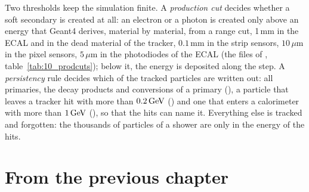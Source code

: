 \begin{plainwords}
Two thresholds keep the simulation finite. A \emph{production cut} decides whether a soft secondary is created
at all: an electron or a photon is created only above an energy that Geant4 derives, material by material, from a
range cut, 1\,mm in the ECAL and in the dead material of the tracker, $0.1$\,mm in the strip sensors, $10\,\mu$m
in the pixel sensors, $5\,\mu$m in the photodiodes of the ECAL (the  files of ,
table~\ref{tab:10_prodcuts}); below it, the energy is
deposited along the step. A \emph{persistency} rule decides which of the tracked particles are written out: all primaries, the decay
products and conversions of a primary (), a particle that leaves
a tracker hit with more than $0.2\,\mathrm{GeV}$ () and one that enters a
calorimeter with more than $1\,\mathrm{GeV}$ (), so that the hits can name it. Everything else is tracked
and forgotten: the thousands of particles of a shower are only in the energy of the hits.
\end{plainwords}

\section{From the previous chapter}

